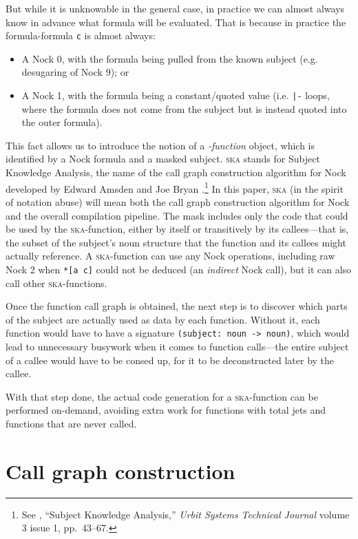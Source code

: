 \documentclass[twoside]{article}
\begin{document}
But while it is unknowable in the general case, in practice we can almost always know in advance what formula will be evaluated. That is because in practice the formula-formula \texttt{c} is almost always:
\begin{itemize}
  \item A Nock 0, with the formula being pulled from the known subject (e.g. desugaring of Nock 9); or
  \item A Nock 1, with the formula being a constant/quoted value (i.e. \texttt{|-} loops, where the formula does not come from the subject but is instead quoted into the outer formula).
\end{itemize}
\noindent
This fact allows us to introduce the notion of a \emph{-function} object, which is identified by a Nock formula and a masked subject. \textsc{ska} stands for Subject Knowledge Analysis, the name of the call graph construction algorithm for Nock developed by Edward Amsden  and Joe Bryan .\footnote{See , ``Subject Knowledge Analysis,'' \emph{Urbit Systems Technical Journal} volume 3 issue 1, pp.~43--67.} In this paper, \textsc{ska} (in the spirit of notation abuse) will mean both the call graph construction algorithm for Nock and the overall compilation pipeline. The mask includes only the code that could be used by the \textsc{ska}-function, either by itself or transitively by its callees---that is, the subset of the subject's noun structure that the function and its callees might actually reference. A \textsc{ska}-function can use any Nock operations, including raw Nock 2 when \texttt{*[a c]} could not be deduced (an \emph{indirect} Nock call), but it can also call other \textsc{ska}-functions.

Once the function call graph is obtained, the next step is to discover which parts of the subject are actually used as data by each function. Without it, each function would have to have a signature \lstinline[style=inlinecode]{(subject: noun -> noun)}, which would lead to unnecessary busywork when it comes to function calls---the entire subject of a callee would have to be consed up, for it to be deconstructed later by the callee.

With that step done, the actual code generation for a \textsc{ska}-function can be performed on-demand, avoiding extra work for functions with total jets and functions that are never called.

\section{Call graph construction}
\end{document}

